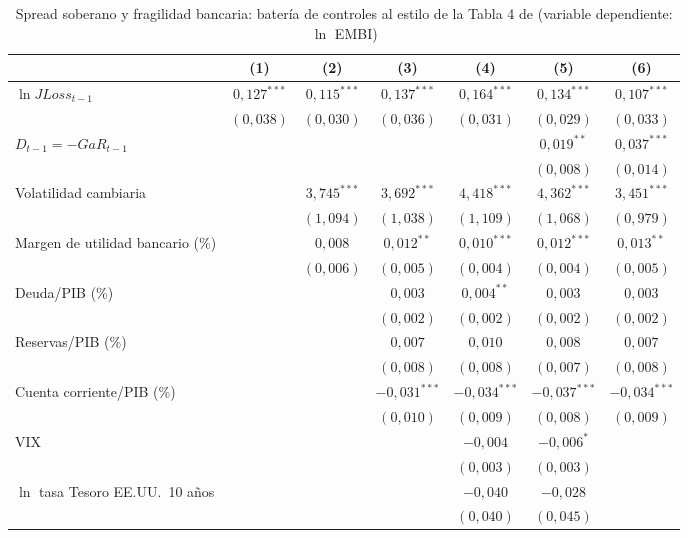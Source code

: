 \begin{table}[htbp]
\centering
\footnotesize
\setlength{\tabcolsep}{4pt}
\caption[Batería estilo Chari et al.\ (2024)]{Spread soberano y fragilidad bancaria: batería de controles al estilo de la Tabla 4 de \citet{Chari2024b} (variable dependiente: $\ln$ EMBI)}
\label{tab:chari-arb}
\begin{tabular}{lcccccc}
\toprule
 & (1) & (2) & (3) & (4) & (5) & (6) \\
\midrule
$\ln JLoss_{t-1}$ & $0{,}127^{***}$ & $0{,}115^{***}$ & $0{,}137^{***}$ & $0{,}164^{***}$ & $0{,}134^{***}$ & $0{,}107^{***}$ \\
 & $(0{,}038)$ & $(0{,}030)$ & $(0{,}036)$ & $(0{,}031)$ & $(0{,}029)$ & $(0{,}033)$ \\
$D_{t-1}=-GaR_{t-1}$ &  &  &  &  & $0{,}019^{**}$ & $0{,}037^{***}$ \\
 &  &  &  &  & $(0{,}008)$ & $(0{,}014)$ \\
Volatilidad cambiaria &  & $3{,}745^{***}$ & $3{,}692^{***}$ & $4{,}418^{***}$ & $4{,}362^{***}$ & $3{,}451^{***}$ \\
 &  & $(1{,}094)$ & $(1{,}038)$ & $(1{,}109)$ & $(1{,}068)$ & $(0{,}979)$ \\
Margen de utilidad bancario (\%) &  & $0{,}008$ & $0{,}012^{**}$ & $0{,}010^{***}$ & $0{,}012^{***}$ & $0{,}013^{**}$ \\
 &  & $(0{,}006)$ & $(0{,}005)$ & $(0{,}004)$ & $(0{,}004)$ & $(0{,}005)$ \\
Deuda/PIB (\%) &  &  & $0{,}003$ & $0{,}004^{**}$ & $0{,}003$ & $0{,}003$ \\
 &  &  & $(0{,}002)$ & $(0{,}002)$ & $(0{,}002)$ & $(0{,}002)$ \\
Reservas/PIB (\%) &  &  & $0{,}007$ & $0{,}010$ & $0{,}008$ & $0{,}007$ \\
 &  &  & $(0{,}008)$ & $(0{,}008)$ & $(0{,}007)$ & $(0{,}008)$ \\
Cuenta corriente/PIB (\%) &  &  & $-0{,}031^{***}$ & $-0{,}034^{***}$ & $-0{,}037^{***}$ & $-0{,}034^{***}$ \\
 &  &  & $(0{,}010)$ & $(0{,}009)$ & $(0{,}008)$ & $(0{,}009)$ \\
VIX &  &  &  & $-0{,}004$ & $-0{,}006^{*}$ &  \\
 &  &  &  & $(0{,}003)$ & $(0{,}003)$ &  \\
$\ln$ tasa Tesoro EE.UU.\ 10 años &  &  &  & $-0{,}040$ & $-0{,}028$ &  \\
 &  &  &  & $(0{,}040)$ & $(0{,}045)$ &  \\

\end{tabular}
\end{table}
